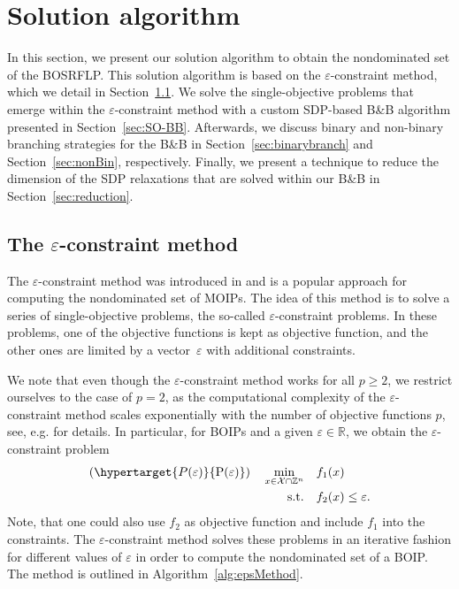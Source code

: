\documentclass{article}
\newcommand{\mytag}[1]{(\hypertarget{#1}{\mathrm{#1}})}
\newcommand{\BB}{B\&B\xspace}
\newcommand{\BOSRFLP}{BOSRFLP\xspace}
\begin{document}
\section{Solution algorithm}\label{sec:algorithm}
In this section, we present our solution algorithm to obtain the nondominated set of the \BOSRFLP. This solution algorithm is based on the $\varepsilon$-constraint method, which we detail in Section~\ref{sec:epsMethod}. We solve the single-objective problems that emerge within the $\varepsilon$-constraint method with a custom SDP-based \BB algorithm presented in Section~\ref{sec:SO-BB}. Afterwards, we discuss binary and non-binary branching strategies for the \BB in Section~\ref{sec:binarybranch} and Section~\ref{sec:nonBin}, respectively. Finally, we present a technique to reduce the dimension of the SDP relaxations that are solved within our \BB in Section~\ref{sec:reduction}. 

\subsection{The \texorpdfstring{$\varepsilon$-constraint method}{epsilon-constraint method}}\label{sec:epsMethod}
The $\varepsilon$-constraint method was introduced in \citet{Haimes1971} and is a popular approach for computing the nondominated set of MOIPs. The idea of this method is to solve a series of single-objective problems, the so-called $\varepsilon$-constraint problems. In these problems, one of the objective functions is kept as objective function, and the other ones are limited by a vector~$\varepsilon$ with additional constraints.

We note that even though the $\varepsilon$-constraint method works for all $p\geq2$, we restrict ourselves to the case of $p=2$, as the computational complexity of the $\varepsilon$-constraint method scales exponentially with the number of objective functions $p$, see, e.g. \citet{LAUMANNS2006} for details.
In particular, for BOIPs and a given $\varepsilon \in \mathbb{R}$, we obtain the $\varepsilon$-constraint problem 
\begin{align*} \label{eq:epsProblem}
   \mytag{P(\varepsilon)} \quad  \min_{x \in \mathcal{X} \cap \mathbb Z^n} \quad &f_1 (x) \\
    \text{s.t.} \quad &f_2(x) \leq \varepsilon. 
\end{align*} 
Note, that one could also use $f_2$ as objective function and include $f_1$ into the constraints. 
The $\varepsilon$-constraint method solves these problems in an iterative fashion for different values of $\varepsilon$ in order to compute the nondominated set of a BOIP. The method is outlined in Algorithm~\ref{alg:epsMethod}.
\end{document}
